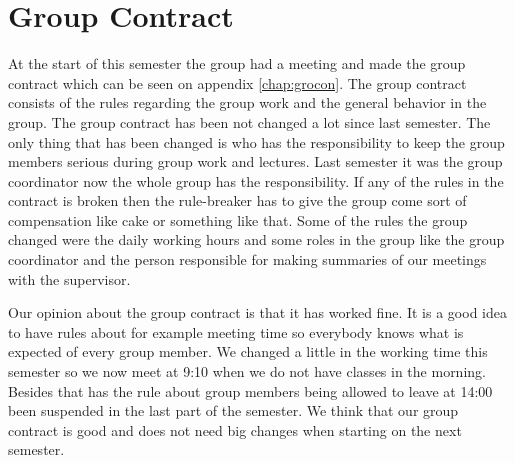 \section{Group Contract}
At the start of this semester the group had a meeting and made the group contract which can be seen on appendix \ref{chap:grocon}. The group contract consists of the rules regarding the group work and the general behavior in the group. The group contract has been not changed a lot since last semester. The only thing that has been changed is who has the responsibility to keep the group members serious during group work and lectures. Last semester it was the group coordinator now the whole group has the responsibility. If any of the rules in the contract is broken then the rule-breaker has to give the group come sort of compensation like cake or something like that. Some of the rules the group changed were the daily working hours and some roles in the group like the group coordinator and the person responsible for making summaries of our meetings with the supervisor. 

Our opinion about the group contract is that it has worked fine. It is a good idea to have rules about for example meeting time so everybody knows what is expected of every group member. We changed a little in the working time this semester so we now meet at 9:10 when we do not have classes in the morning. Besides that has the rule about group members being allowed to leave at 14:00 been suspended in the last part of the semester. We think that our group contract is good and does not need big changes when starting on the next semester.